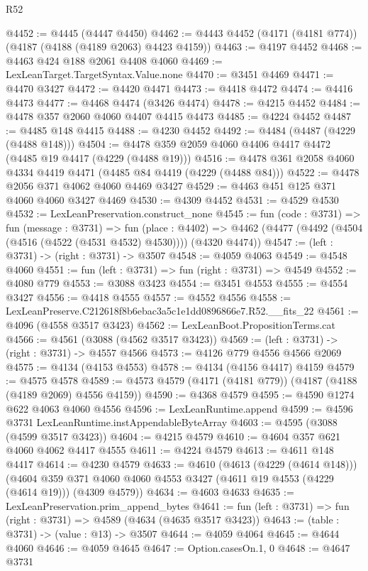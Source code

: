 \begin{lexlean}{R52}
\begin{coremodule}
@4452 := @4445 (@4447 @4450)
@4462 := @4443 @4452 (@4171 (@4181 @774)) (@4187 (@4188 (@4189 @2063) @4423 @4159))
@4463 := @4197 @4452
@4468 := @4463 @424 @188 @2061 @4408 @4060
@4469 := LexLeanTarget.TargetSyntax.Value.none
@4470 := @3451 @4469
@4471 := @4470 @3427
@4472 := @4420 @4471
@4473 := @4418 @4472
@4474 := @4416 @4473
@4477 := @4468 @4474 (@3426 @4474)
@4478 := @4215 @4452
@4484 := @4478 @357 @2060 @4060 @4407 @4415 @4473
@4485 := @4224 @4452
@4487 := @4485 @148 @4415
@4488 := @4230 @4452
@4492 := @4484 (@4487 (@4229 (@4488 @148)))
@4504 := @4478 @359 @2059 @4060 @4406 @4417 @4472 (@4485 @19 @4417 (@4229 (@4488 @19)))
@4516 := @4478 @361 @2058 @4060 @4334 @4419 @4471 (@4485 @84 @4419 (@4229 (@4488 @84)))
@4522 := @4478 @2056 @371 @4062 @4060 @4469 @3427
@4529 := @4463 @451 @125 @371 @4060 @4060 @3427 @4469
@4530 := @4309 @4452
@4531 := @4529 @4530
@4532 := LexLeanPreservation.construct_none
@4545 := fun (code : @3731) =>
  fun (message : @3731) =>
  fun (place : @4402) =>
  @4462 (@4477 (@4492 (@4504 (@4516 (@4522 (@4531 @4532) @4530)))) (@4320 @4474))
@4547 := (left : @3731) -> (right : @3731) -> @3507
@4548 := @4059 @4063
@4549 := @4548 @4060
@4551 := fun (left : @3731) => fun (right : @3731) => @4549
@4552 := @4080 @779
@4553 := @3088 @3423
@4554 := @3451 @4553
@4555 := @4554 @3427
@4556 := @4418 @4555
@4557 := @4552 @4556
@4558 := LexLeanPreserve.C212618f8b6ebac3a5c1e1dd0896866e7.R52.__fits_22
@4561 := @4096 (@4558 @3517 @3423)
@4562 := LexLeanBoot.PropositionTerms.cat
@4566 := @4561 (@3088 (@4562 @3517 @3423))
@4569 := (left : @3731) -> (right : @3731) -> @4557 @4566
@4573 := @4126 @779 @4556 @4566 @2069
@4575 := @4134 (@4153 @4553)
@4578 := @4134 (@4156 @4417) @4159
@4579 := @4575 @4578
@4589 := @4573 @4579 (@4171 (@4181 @779)) (@4187 (@4188 (@4189 @2069) @4556 @4159))
@4590 := @4368 @4579
@4595 := @4590 @1274 @622 @4063 @4060 @4556
@4596 := LexLeanRuntime.append
@4599 := @4596 @3731 LexLeanRuntime.instAppendableByteArray
@4603 := @4595 (@3088 (@4599 @3517 @3423))
@4604 := @4215 @4579
@4610 := @4604 @357 @621 @4060 @4062 @4417 @4555
@4611 := @4224 @4579
@4613 := @4611 @148 @4417
@4614 := @4230 @4579
@4633 := @4610
    (@4613 (@4229 (@4614 @148)))
    (@4604 @359 @371 @4060 @4060 @4553 @3427 (@4611 @19 @4553 (@4229 (@4614 @19))) (@4309 @4579))
@4634 := @4603 @4633
@4635 := LexLeanPreservation.prim_append_bytes
@4641 := fun (left : @3731) => fun (right : @3731) => @4589 (@4634 (@4635 @3517 @3423))
@4643 := (table : @3731) -> (value : @13) -> @3507
@4644 := @4059 @4064
@4645 := @4644 @4060
@4646 := @4059 @4645
@4647 := Option.casesOn.{1, 0}
@4648 := @4647 @3731

\end{coremodule}
\end{lexlean}
